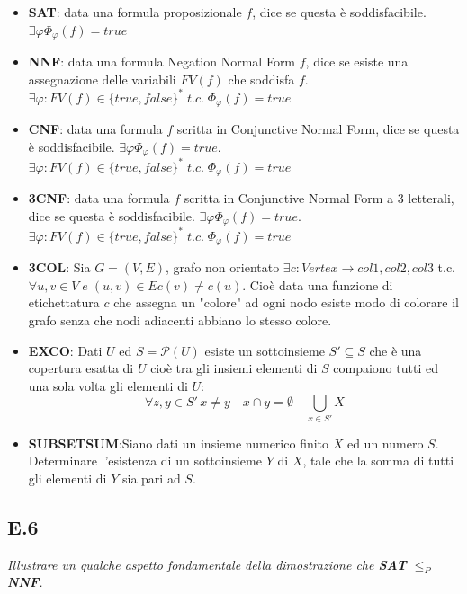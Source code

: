 \documentclass[a4paper]{article}
\begin{document}
\begin{itemize}
	\item \textbf{SAT}: data una formula proposizionale $f$, dice se questa è soddisfacibile. $\exists \varphi \Phi _ {\varphi}(f) = true $
	\item \textbf{NNF}: data una formula Negation Normal Form $f$, dice se esiste una assegnazione delle variabili $FV(f)$ che soddisfa $f$.\\$\exists \varphi:FV(f) \in \{true,false\}^* \; t.c. \; \Phi _ {\varphi}(f) = true $
	\item \textbf{CNF}: data una formula $f$ scritta in Conjunctive Normal Form, dice se questa è soddisfacibile. $\exists \varphi \Phi _ {\varphi}(f) = true $.\\
$\exists \varphi:FV(f) \in \{true,false\}^* \; t.c. \; \Phi _ {\varphi}(f) = true $
	\item \textbf{3CNF}: data una formula $f$ scritta in Conjunctive Normal Form a 3 letterali, dice se questa è soddisfacibile. $\exists \varphi \Phi _ {\varphi}(f) = true $.\\
$\exists \varphi:FV(f) \in \{true,false\}^* \; t.c. \; \Phi _ {\varphi}(f) = true $
	\item \textbf{3COL}: Sia $G = (V,E)$, grafo non orientato $\exists c : Vertex \rightarrow {col1,col2,col3}$ t.c. $\forall u,v \in V \; e \; (u,v) \in E c(v) \neq c(u)$.
		Cioè data una funzione di etichettatura $c$ che assegna un "colore" ad ogni nodo esiste modo di colorare il grafo senza che nodi adiacenti abbiano lo stesso colore.
	\item \textbf{EXCO}: Dati $U$ ed $S=\mathcal{P}(U)$ esiste un sottoinsieme $S' \subseteq S$ che è una copertura esatta di $U$ cioè tra gli insiemi elementi di $S$ compaiono tutti ed una sola volta gli elementi di $U$:
		$$\forall z,y \in S'\, x \neq y \quad x \cap y = \emptyset \quad \bigcup_{x \in S'}X $$
	\item \textbf{SUBSETSUM}:Siano dati un insieme numerico finito $X$ ed un numero $S$. Determinare l’esistenza di un sottoinsieme $Y$ di $X$, tale che la somma di tutti gli elementi di $Y$ sia pari ad $S$. 
\end{itemize}
\subsection{E.6}
\emph{Illustrare un qualche aspetto fondamentale della dimostrazione che \textbf{SAT} $\leq_P$ \textbf{NNF}.}
\end{document}
